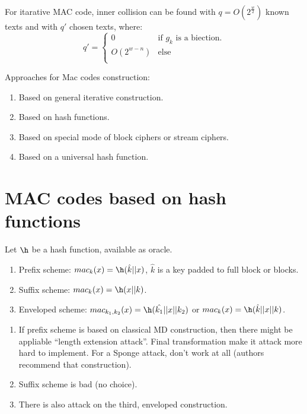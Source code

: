 \begin{theorem}
    For itarative MAC code, inner collision can be found with $q = O(2^{\frac{w}{2}})$
    known texts and with $q'$ chosen texts, where:
    $$q' = \left\{ \begin{array}{cc}
        0               & \text{if $g_k$ is a biection.} \\
        O(2^{w - n})    & \text{else} \\
    \end{array} \right.$$
\end{theorem}

Approaches for Mac codes construction:
\begin{enumerate}
    \item Based on general iterative construction.
    \item Based on hash functions.
    \item Based on special mode of block ciphers or stream ciphers.
    \item Based on a universal hash function.
\end{enumerate}

\section{MAC codes based on hash functions}

\begin{remark}
    Let $\h$ be a hash function, available as oracle.
\end{remark}

\begin{definition}
    \begin{enumerate}
        \item Prefix scheme: $mac_k(x) = \h(\hat{k} || x)$, $\hat{k}$ is a key
            padded to full block or blocks.
        \item Suffix scheme: $mac_k(x) = \h(x || k)$.
        \item Enveloped scheme: $mac_{k_1, k_2}(x) = \h(\hat{k_1} || x || k_2)$
            or $mac_{k}(x) = \h(\hat{k} || x || k)$.
    \end{enumerate}
\end{definition}

\begin{remark}
    \begin{enumerate}
        \item If prefix scheme is based on classical MD construction, then
            there might be appliable ``length extension attack''.
            Final transformation make it attack more hard to implement.
            For a Sponge attack, don't work at all (authors recommend that construction).
        \item Suffix scheme is bad (no choice).
        \item There is also attack on the third, enveloped construction.
    \end{enumerate}
\end{remark}

